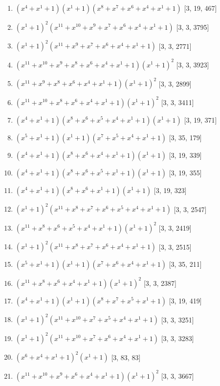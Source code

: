 \documentclass[10pt,twocolumn]{article}
\begin{document}
\begin{enumerate}
\item $(x^{4} + x^{1} + 1)(x^{1} + 1)(x^{8} + x^{7} + x^{6} + x^{4} + x^{1} + 1)$  [3, 19, 467]
\item $(x^{1} + 1)^{2}(x^{11} + x^{10} + x^{9} + x^{7} + x^{6} + x^{4} + x^{1} + 1)$  [3, 3, 3795]
\item $(x^{1} + 1)^{2}(x^{11} + x^{9} + x^{7} + x^{6} + x^{4} + x^{1} + 1)$  [3, 3, 2771]
\item $(x^{11} + x^{10} + x^{9} + x^{8} + x^{6} + x^{4} + x^{1} + 1)(x^{1} + 1)^{2}$  [3, 3, 3923]
\item $(x^{11} + x^{9} + x^{8} + x^{6} + x^{4} + x^{1} + 1)(x^{1} + 1)^{2}$  [3, 3, 2899]
\item $(x^{11} + x^{10} + x^{8} + x^{6} + x^{4} + x^{1} + 1)(x^{1} + 1)^{2}$  [3, 3, 3411]
\item $(x^{4} + x^{1} + 1)(x^{8} + x^{6} + x^{5} + x^{4} + x^{1} + 1)(x^{1} + 1)$  [3, 19, 371]
\item $(x^{5} + x^{1} + 1)(x^{1} + 1)(x^{7} + x^{5} + x^{4} + x^{1} + 1)$  [3, 35, 179]
\item $(x^{4} + x^{1} + 1)(x^{8} + x^{6} + x^{4} + x^{1} + 1)(x^{1} + 1)$  [3, 19, 339]
\item $(x^{4} + x^{1} + 1)(x^{8} + x^{6} + x^{5} + x^{1} + 1)(x^{1} + 1)$  [3, 19, 355]
\item $(x^{4} + x^{1} + 1)(x^{8} + x^{6} + x^{1} + 1)(x^{1} + 1)$  [3, 19, 323]
\item $(x^{1} + 1)^{2}(x^{11} + x^{8} + x^{7} + x^{6} + x^{5} + x^{4} + x^{1} + 1)$  [3, 3, 2547]
\item $(x^{11} + x^{8} + x^{6} + x^{5} + x^{4} + x^{1} + 1)(x^{1} + 1)^{2}$  [3, 3, 2419]
\item $(x^{1} + 1)^{2}(x^{11} + x^{8} + x^{7} + x^{6} + x^{4} + x^{1} + 1)$  [3, 3, 2515]
\item $(x^{5} + x^{1} + 1)(x^{1} + 1)(x^{7} + x^{6} + x^{4} + x^{1} + 1)$  [3, 35, 211]
\item $(x^{11} + x^{8} + x^{6} + x^{4} + x^{1} + 1)(x^{1} + 1)^{2}$  [3, 3, 2387]
\item $(x^{4} + x^{1} + 1)(x^{1} + 1)(x^{8} + x^{7} + x^{5} + x^{1} + 1)$  [3, 19, 419]
\item $(x^{1} + 1)^{2}(x^{11} + x^{10} + x^{7} + x^{5} + x^{4} + x^{1} + 1)$  [3, 3, 3251]
\item $(x^{1} + 1)^{2}(x^{11} + x^{10} + x^{7} + x^{6} + x^{4} + x^{1} + 1)$  [3, 3, 3283]
\item $(x^{6} + x^{4} + x^{1} + 1)^{2}(x^{1} + 1)$  [3, 83, 83]
\item $(x^{11} + x^{10} + x^{9} + x^{6} + x^{4} + x^{1} + 1)(x^{1} + 1)^{2}$  [3, 3, 3667]

\end{enumerate}
\end{document}
